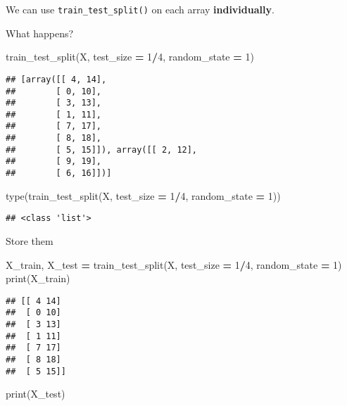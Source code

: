 \documentclass[
]{book}
\newenvironment{Shaded}{\begin{snugshade}}{\end{snugshade}}
\newcommand{\BuiltInTok}[1]{#1}
\newcommand{\DecValTok}[1]{\textcolor[rgb]{0.00,0.00,0.81}{#1}}
\newcommand{\NormalTok}[1]{#1}
\newcommand{\OperatorTok}[1]{\textcolor[rgb]{0.81,0.36,0.00}{\textbf{#1}}}
\begin{document}
We can use \texttt{train\_test\_split()} on each array \textbf{individually}.

What happens?

\begin{Shaded}
\begin{Highlighting}[]
\NormalTok{train\_test\_split(X, test\_size }\OperatorTok{=} \DecValTok{1}\OperatorTok{/}\DecValTok{4}\NormalTok{, random\_state }\OperatorTok{=} \DecValTok{1}\NormalTok{)}
\end{Highlighting}
\end{Shaded}

\begin{verbatim}
## [array([[ 4, 14],
##        [ 0, 10],
##        [ 3, 13],
##        [ 1, 11],
##        [ 7, 17],
##        [ 8, 18],
##        [ 5, 15]]), array([[ 2, 12],
##        [ 9, 19],
##        [ 6, 16]])]
\end{verbatim}

\begin{Shaded}
\begin{Highlighting}[]
\BuiltInTok{type}\NormalTok{(train\_test\_split(X, test\_size }\OperatorTok{=} \DecValTok{1}\OperatorTok{/}\DecValTok{4}\NormalTok{, random\_state }\OperatorTok{=} \DecValTok{1}\NormalTok{))}
\end{Highlighting}
\end{Shaded}

\begin{verbatim}
## <class 'list'>
\end{verbatim}

Store them

\begin{Shaded}
\begin{Highlighting}[]
\NormalTok{X\_train, X\_test }\OperatorTok{=}\NormalTok{ train\_test\_split(X, test\_size }\OperatorTok{=} \DecValTok{1}\OperatorTok{/}\DecValTok{4}\NormalTok{, random\_state }\OperatorTok{=} \DecValTok{1}\NormalTok{)}
\BuiltInTok{print}\NormalTok{(X\_train)}
\end{Highlighting}
\end{Shaded}

\begin{verbatim}
## [[ 4 14]
##  [ 0 10]
##  [ 3 13]
##  [ 1 11]
##  [ 7 17]
##  [ 8 18]
##  [ 5 15]]
\end{verbatim}

\begin{Shaded}
\begin{Highlighting}[]
\BuiltInTok{print}\NormalTok{(X\_test)}
\end{Highlighting}
\end{Shaded}
\end{document}
